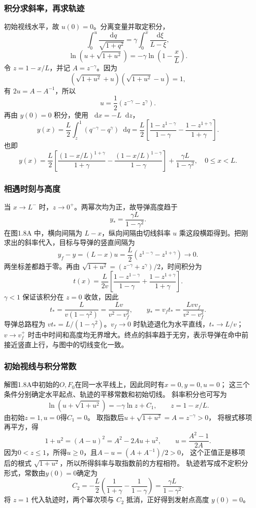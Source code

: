 \documentclass[UTF8,fontset=fandol,a4paper,11pt]{ctexart}
\newcommand{\dd}{\mathop{}\!\mathrm{d}}
\begin{document}
\subsubsection*{积分求斜率，再求轨迹}
初始视线水平，故 $u(0)=0$。分离变量并取定积分，
\[
\int_0^u\frac{\dd q}{\sqrt{1+q^2}}
=\gamma\int_0^x\frac{\dd\xi}{L-\xi},
\]
\[
\ln(u+\sqrt{1+u^2})=-\gamma\ln\left(1-\frac xL\right).
\]
令 $z=1-x/L$，并记 $A=z^{-\gamma}$。因为
\[
(\sqrt{1+u^2}+u)(\sqrt{1+u^2}-u)=1,
\]
有 $2u=A-A^{-1}$，所以
\[
u=\frac12(z^{-\gamma}-z^\gamma).
\]
再由 $y(0)=0$ 积分，使用 $\dd x=-L\dd z$，
\[
y(x)=\frac L2\int_z^1(q^{-\gamma}-q^\gamma)\dd q
=\frac L2\left[\frac{1-z^{1-\gamma}}{1-\gamma}
-\frac{1-z^{1+\gamma}}{1+\gamma}\right].
\]
也即
\[
\boxed{y(x)=\frac L2\left[
\frac{(1-x/L)^{1+\gamma}}{1+\gamma}
-\frac{(1-x/L)^{1-\gamma}}{1-\gamma}\right]
+\frac{\gamma L}{1-\gamma^2}},\quad0\leq x<L.
\]
\subsubsection*{相遇时刻与高度}
当 $x\to L^-$ 时，$z\to0^+$。两幂次均为正，故导弹高度趋于
\[
y_* =\frac{\gamma L}{1-\gamma^2}.
\]
在图1.8A 中，横向间隔为 $L-x$，纵向间隔由切线斜率 $u$ 乘这段横距得到。把刚求出的斜率代入，目标与导弹的竖直间隔为
\[
y_f-y=(L-x)u=\frac L2(z^{1-\gamma}-z^{1+\gamma})
\longrightarrow0.
\]
两坐标差都趋于零。再由 $\sqrt{1+u^2}=(z^{-\gamma}+z^\gamma)/2$，时间积分为
\[
t(x)=\frac L{2v}\left[
\frac{1-z^{1-\gamma}}{1-\gamma}
+\frac{1-z^{1+\gamma}}{1+\gamma}\right].
\]
$\gamma<1$ 保证该积分在 $z=0$ 收敛，因此
\[
\boxed{t_* =\frac L{v(1-\gamma^2)}
=\frac{Lv}{v^2-v_f^2}},\qquad
\boxed{y_* =v_ft_* =\frac{Lvv_f}{v^2-v_f^2}}.
\]
导弹总路程为 $vt_*=L/(1-\gamma^2)$。$v_f\to0$ 时轨迹退化为水平直线，$t_*\to L/v$；$v\to v_f^+$ 时击中时间和高度均无界增大。终点的斜率趋于无穷，表示导弹在命中前接近竖直上行，与图中的切线变化一致。
\subsubsection*{初始视线与积分常数}
解图1.8A中初始的$O,F_0$在同一水平线上，因此同时有$x=0,y=0,u=0$；
这三个条件分别确定水平起点、轨迹的平移常数和初始切线。
斜率积分也可写为
\[
\ln(u+\sqrt{1+u^2})=-\gamma\ln z+C_1,\qquad z=1-x/L.
\]
由初始$z=1,u=0$得$C_1=0$。
取指数后$u+\sqrt{1+u^2}=A=z^{-\gamma}>0$，
将根式移项再平方，得
\[
1+u^2=(A-u)^2=A^2-2Au+u^2,\qquad
u=\frac{A^2-1}{2A}.
\]
因为$0<z\leq1$，所得$u\geq0$，且$A-u=(A+A^{-1})/2>0$，
这个正值正是移项后的根式 $\sqrt{1+u^2}$，所以所得斜率与取指数前的方程相符。
轨迹若写成不定积分形式，常数由$y(0)=0$确定为
\[
C_2=-\frac L2\left(\frac1{1+\gamma}-\frac1{1-\gamma}\right)
=\frac{\gamma L}{1-\gamma^2}.
\]
将 $z=1$ 代入轨迹时，两个幂次项与 $C_2$ 抵消，正好得到发射点高度 $y(0)=0$。
\end{document}
